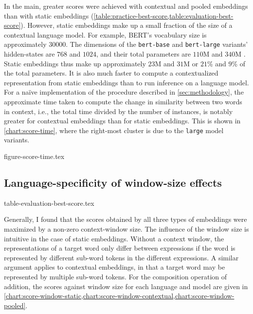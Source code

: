In the main, greater scores were achieved with contextual and pooled embeddings than
with static embeddings (\cref{table:practice-best-score,table:evaluation-best-score}).
However, static embeddings make up a small fraction of the size of a contextual
language model.
For example, BERT's vocabulary size is approximately $30000$.
The dimensions of the \texttt{bert-base} and \texttt{bert-large} variants'
hidden-states are $768$ and $1024$, and their total parameters are $110$M and $340$M
\parencite[4173-4174]{Devlin2019}.
Static embeddings thus make up approximately $23$M and $31$M or $21$\% and $9$\% of the
total parameters.
It is also much faster to compute a contextualized representation from static
embeddings than to run inference on a language model.
For a naïve implementation of the procedure described in \cref{sec:methodology}, the
approximate time taken to compute the change in similarity between two words in
context, i.e., the total time divided by the number of instances, is notably greater
for contextual embeddings than for static embeddings.
This is shown in \cref{chart:score-time}, where the right-most cluster is due to the
\texttt{large} model variants.
\\

{figure-score-time.tex}

\subsection{Language-specificity of window-size effects}
\label{sec:language-specificity}

{table-evaluation-best-score.tex}

Generally, I found that the scores obtained by all three types of embeddings were
maximized by a non-zero context-window size.
The influence of the window size is intuitive in the case of static embeddings.
Without a context window, the representations of a target word only differ between
expressions if the word is represented by different sub-word tokens in the different
expressions.
A similar argument applies to contextual embeddings, in that a target word may be
represented by multiple sub-word tokens.
For the composition operation of addition, the scores against window size for each
language and model are given in
\cref{chart:score-window-static,chart:score-window-contextual,chart:score-window-pooled}.


